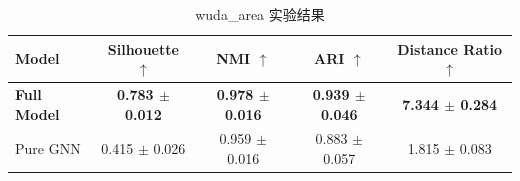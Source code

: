 \begin{table}[htbp]
  \centering
  \caption{wuda_area 实验结果}
  \label{tab:wuda_area_results}
  \begin{tabular}{lcccc}
    \toprule
    Model & Silhouette $\uparrow$ & NMI $\uparrow$ & ARI $\uparrow$ & Distance Ratio $\uparrow$ \\
    \midrule
    \textbf{Full Model} & \textbf{0.783 $\pm$ 0.012} & \textbf{0.978 $\pm$ 0.016} & \textbf{0.939 $\pm$ 0.046} & \textbf{7.344 $\pm$ 0.284} \\
    Pure GNN & 0.415 $\pm$ 0.026 & 0.959 $\pm$ 0.016 & 0.883 $\pm$ 0.057 & 1.815 $\pm$ 0.083 \\
    \bottomrule
  \end{tabular}
\end{table}